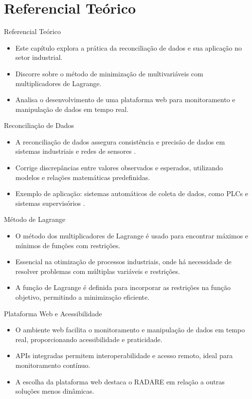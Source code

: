 \section{Referencial Teórico}

\begin{frame}{Referencial Teórico}
    \begin{itemize}
        \item Este capítulo explora a prática da reconciliação de dados e sua aplicação no setor industrial.
        \item Discorre sobre o método de minimização de multivariáveis com multiplicadores de Lagrange.
        \item Analisa o desenvolvimento de uma plataforma web para monitoramento e manipulação de dados em tempo real.
    \end{itemize}
\end{frame}

\begin{frame}{Reconciliação de Dados}
    \begin{itemize}
        \item A reconciliação de dados assegura consistência e precisão de dados em sistemas industriais e redes de sensores \cite{datarecshakar}.
        \item Corrige discrepâncias entre valores observados e esperados, utilizando modelos e relações matemáticas predefinidas.
        \item Exemplo de aplicação: sistemas automáticos de coleta de dados, como PLCs e sistemas supervisórios \cite{plcsupervisory2021}.
    \end{itemize}
\end{frame}

\begin{frame}{Método de Lagrange}
    \begin{itemize}
        \item O método dos multiplicadores de Lagrange é usado para encontrar máximos e mínimos de funções com restrições.
        \item Essencial na otimização de processos industriais, onde há necessidade de resolver problemas com múltiplas variáveis e restrições.
        \item A função de Lagrange é definida para incorporar as restrições na função objetivo, permitindo a minimização eficiente.
    \end{itemize}
\end{frame}

\begin{frame}{Plataforma Web e Acessibilidade}
    \begin{itemize}
        \item O ambiente web facilita o monitoramento e manipulação de dados em tempo real, proporcionando acessibilidade e praticidade.
        \item APIs integradas permitem interoperabilidade e acesso remoto, ideal para monitoramento contínuo.
        \item A escolha da plataforma web destaca o RADARE em relação a outras soluções menos dinâmicas.
    \end{itemize}
\end{frame}

